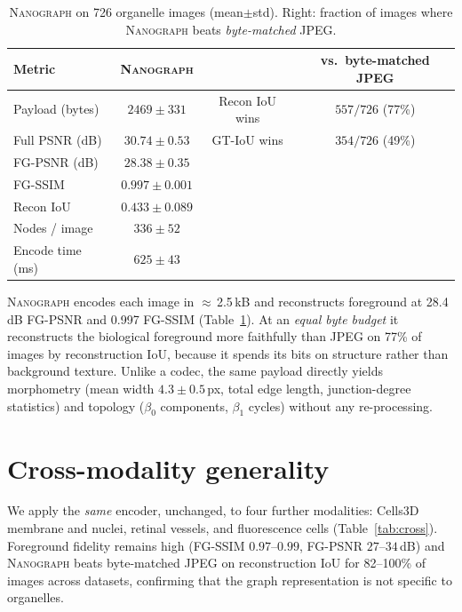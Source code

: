 \documentclass[runningheads]{llncs}
\newcommand{\method}{\textsc{Nanograph}\xspace}
\begin{document}
\begin{table}[t]
\centering
\caption{\method on 726 organelle images (mean$\pm$std). Right: fraction of
images where \method beats \emph{byte-matched} JPEG.}
\label{tab:nmi}
\setlength{\tabcolsep}{5pt}
\begin{tabular}{lccc}
\toprule
Metric & \method & & vs.\ byte-matched JPEG \\
\midrule
Payload (bytes)      & $2469\pm331$   & Recon IoU wins   & $557/726$ (77\%)\\
Full PSNR (dB)       & $30.74\pm0.53$ & GT-IoU wins      & $354/726$ (49\%)\\
FG-PSNR (dB)         & $28.38\pm0.35$ & \multicolumn{2}{l}{}\\
FG-SSIM              & $0.997\pm0.001$& \multicolumn{2}{l}{}\\
Recon IoU            & $0.433\pm0.089$& \multicolumn{2}{l}{}\\
Nodes / image        & $336\pm52$     & \multicolumn{2}{l}{}\\
Encode time (ms)     & $625\pm43$     & \multicolumn{2}{l}{}\\
\bottomrule
\end{tabular}
\end{table}

\method encodes each image in $\approx$\,2.5\,kB and reconstructs foreground at
28.4\,dB FG-PSNR and 0.997 FG-SSIM (Table~\ref{tab:nmi}). At an \emph{equal byte
budget} it reconstructs the biological foreground more faithfully than JPEG on
77\% of images by reconstruction IoU, because it spends its bits on structure
rather than background texture. Unlike a codec, the same payload directly yields
morphometry (mean width $4.3\pm0.5$\,px, total edge length, junction-degree
statistics) and topology ($\beta_0$ components, $\beta_1$ cycles) without any
re-processing.

\section{Cross-modality generality}\label{sec:cross}
We apply the \emph{same} encoder, unchanged, to four further modalities:
Cells3D membrane and nuclei, retinal vessels, and fluorescence cells
(Table~\ref{tab:cross}). Foreground fidelity remains high (FG-SSIM
$0.97$--$0.99$, FG-PSNR $27$--$34$\,dB) and \method beats byte-matched JPEG on
reconstruction IoU for 82--100\% of images across datasets, confirming that the
graph representation is not specific to organelles.
\end{document}
